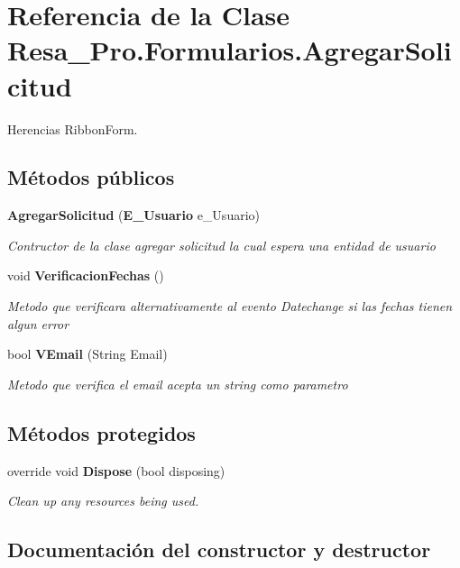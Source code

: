 \section{Referencia de la Clase Resa\+\_\+\+Pro.\+Formularios.\+Agregar\+Solicitud}
\label{class_resa___pro_1_1_formularios_1_1_agregar_solicitud}


Herencias Ribbon\+Form.

\subsection*{Métodos públicos}
\begin{DoxyCompactItemize}
\item 
{\bf Agregar\+Solicitud} ({\bf E\+\_\+\+Usuario} e\+\_\+\+Usuario)
\begin{DoxyCompactList}\small\item\em Contructor de la clase agregar solicitud la cual espera una entidad de usuario \end{DoxyCompactList}\item 
void {\bf Verificacion\+Fechas} ()
\begin{DoxyCompactList}\small\item\em Metodo que verificara alternativamente al evento Datechange si las fechas tienen algun error \end{DoxyCompactList}\item 
bool {\bf V\+Email} (String Email)
\begin{DoxyCompactList}\small\item\em Metodo que verifica el email acepta un string como parametro \end{DoxyCompactList}\end{DoxyCompactItemize}
\subsection*{Métodos protegidos}
\begin{DoxyCompactItemize}
\item 
override void {\bf Dispose} (bool disposing)
\begin{DoxyCompactList}\small\item\em Clean up any resources being used. \end{DoxyCompactList}\end{DoxyCompactItemize}


\subsection{Documentación del constructor y destructor}
